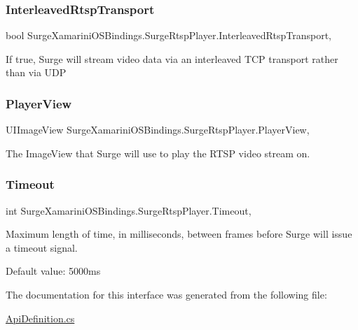 \subsubsection{\texorpdfstring{Interleaved\+Rtsp\+Transport}{InterleavedRtspTransport}}
{\footnotesize\ttfamily bool Surge\+Xamarini\+O\+S\+Bindings.\+Surge\+Rtsp\+Player.\+Interleaved\+Rtsp\+Transport\hspace{0.3cm}{\ttfamily [get]}, {\ttfamily [set]}}



If true, Surge will stream video data via an interleaved T\+CP transport rather than via U\+DP 

\mbox{\label{interface_surge_xamarini_o_s_bindings_1_1_surge_rtsp_player_ab629f9303d6b427a8213e1dee03a3810}} 
\subsubsection{\texorpdfstring{Player\+View}{PlayerView}}
{\footnotesize\ttfamily U\+I\+Image\+View Surge\+Xamarini\+O\+S\+Bindings.\+Surge\+Rtsp\+Player.\+Player\+View\hspace{0.3cm}{\ttfamily [get]}, {\ttfamily [set]}}



The Image\+View that Surge will use to play the R\+T\+SP video stream on. 

\mbox{\label{interface_surge_xamarini_o_s_bindings_1_1_surge_rtsp_player_a5d41ebac63bbd4c26859615abcf1fa0e}} 
\subsubsection{\texorpdfstring{Timeout}{Timeout}}
{\footnotesize\ttfamily int Surge\+Xamarini\+O\+S\+Bindings.\+Surge\+Rtsp\+Player.\+Timeout\hspace{0.3cm}{\ttfamily [get]}, {\ttfamily [set]}}



Maximum length of time, in milliseconds, between frames before Surge will issue a timeout signal. 

Default value\+: 5000ms 

The documentation for this interface was generated from the following file\+:\begin{DoxyCompactItemize}
\item 
\hyperlink{_api_definition_8cs}{Api\+Definition.\+cs}\end{DoxyCompactItemize}
